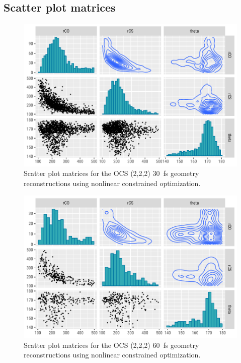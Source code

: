 \subsection{Scatter plot matrices}

\begin{figure}[H]
  \centering
  \includegraphics[width=\textwidth]{Plots/OCS22230fsMOGeometryPairs}
  \caption[Scatter plot matrices for the OCS (2,2,2) \SI{30}{\fs} geometry reconstructions using nonlinear constrained optimization.]
  {Scatter plot matrices for the OCS (2,2,2) \SI{30}{\fs} geometry reconstructions using nonlinear constrained optimization.}
  \label{fig:OCS22230fsMOGeometryPairs}
\end{figure}

\begin{figure}
  \centering
  \includegraphics[width=\textwidth]{Plots/OCS22260fsMOGeometryPairs}
  \caption[Scatter plot matrices for the OCS (2,2,2) \SI{60}{\fs} geometry reconstructions using nonlinear constrained optimization.]
  {Scatter plot matrices for the OCS (2,2,2) \SI{60}{\fs} geometry reconstructions using nonlinear constrained optimization.}
  \label{fig:OCS22260fsMOGeometryPairs}
\end{figure}

